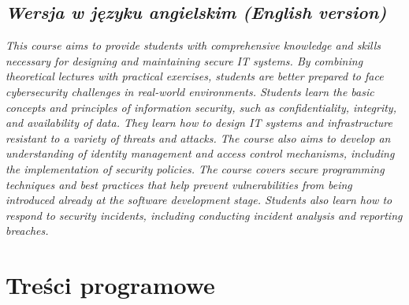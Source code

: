 \documentclass[12pt, a4paper]{article}
\begin{document}
\subsection*{\textit{Wersja w języku angielskim (English version)}}

\textit{This course aims to provide students with comprehensive knowledge and skills necessary for designing and maintaining secure IT systems. By combining theoretical lectures with practical exercises, students are better prepared to face cybersecurity challenges in real-world environments. Students learn the basic concepts and principles of information security, such as confidentiality, integrity, and availability of data. They learn how to design IT systems and infrastructure resistant to a variety of threats and attacks. The course also aims to develop an understanding of identity management and access control mechanisms, including the implementation of security policies. The course covers secure programming techniques and best practices that help prevent vulnerabilities from being introduced already at the software development stage. Students also learn how to respond to security incidents, including conducting incident analysis and reporting breaches.}


\section{Treści programowe}
\end{document}
